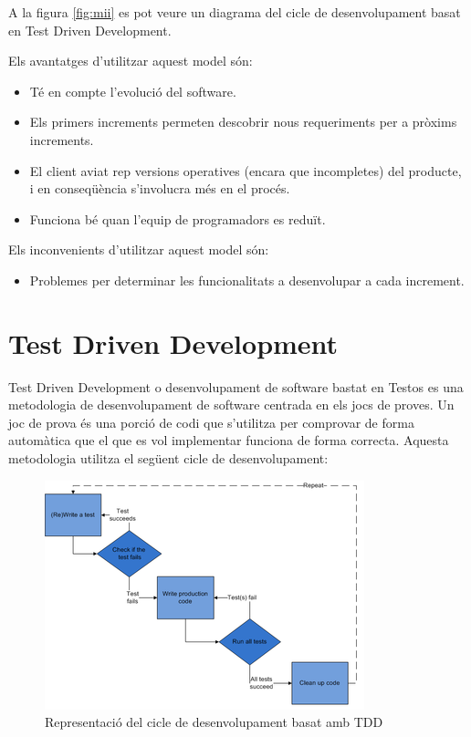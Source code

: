 A la figura \ref{fig:mii} es pot veure un diagrama del cicle de desenvolupament basat en Test Driven Development.

Els avantatges d’utilitzar aquest model són:

\begin{itemize}
\item{Té en compte l’evolució del software.}
\item{Els primers increments permeten descobrir nous requeriments per a pròxims increments.}
\item{El client aviat rep versions operatives (encara que incompletes) del producte, i en conseqüència s’involucra més en el procés.}
\item{Funciona bé quan l’equip de programadors es reduït.}
\end{itemize}

Els inconvenients d’utilitzar aquest model són:

\begin{itemize}
\item{Problemes per determinar les funcionalitats a desenvolupar a cada increment.}
\end{itemize}

\section{Test Driven Development}
\label{sec:tdd}

Test Driven Development o desenvolupament de software bastat en Testos es una metodologia de desenvolupament de software centrada en els jocs de proves. Un joc de prova és una porció de codi que s'utilitza per comprovar de forma automàtica que el que es vol implementar funciona de forma correcta. Aquesta metodologia utilitza el següent cicle de desenvolupament: 

\begin{figure}[htbp]
\centering\includegraphics{img/test-driven-development.png}
\caption{Representació del cicle de desenvolupament basat amb TDD}
\label{fig:tdd}
\end{figure} 

